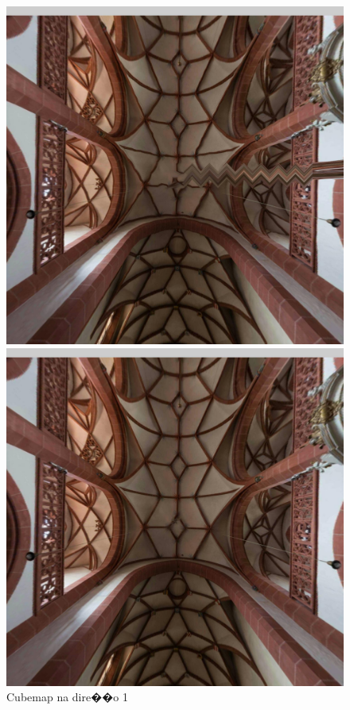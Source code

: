 \documentclass[12pt]{article}
\begin{document}
\begin{figure}[!tbp]
  \centering
  \begin{minipage}[b]{0.3\textwidth}
    \includegraphics[width=1.1\textwidth]{../images/screenshots/Screenshot_2_Equi2Cube.jpg}
    \caption{Cubemap na dire��o 1}
    \label{fig:cubemap_direction_1}
  \end{minipage}
  \hfill
  \begin{minipage}[b]{0.3\textwidth}
    \centering
    \includegraphics[width=1.1\textwidth]{../images/screenshots/Screenshot_2_Skybox.jpg}

\end{minipage}
\end{figure}
\end{document}
